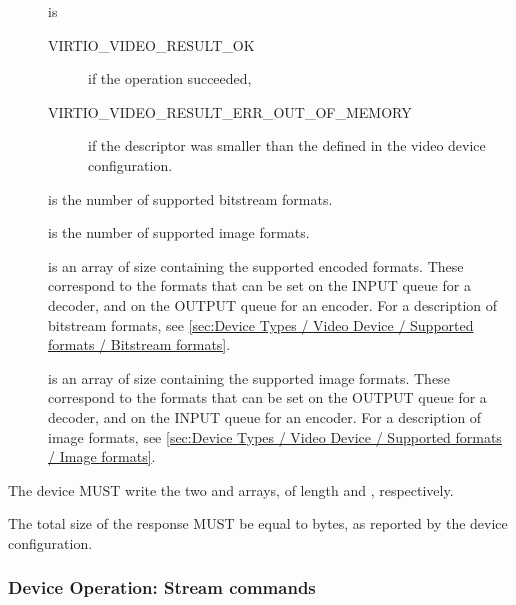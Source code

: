 \begin{description}
\item[]
is

\begin{description}
\item[VIRTIO_VIDEO_RESULT_OK]
if the operation succeeded,
\item[VIRTIO_VIDEO_RESULT_ERR_OUT_OF_MEMORY]
if the descriptor was smaller than the defined  in
the video device configuration.
\end{description}
\item[]
is the number of supported bitstream formats.
\item[]
is the number of supported image formats.
\item[]
is an array of size  containing the
supported encoded formats. These correspond to the formats that can be
set on the INPUT queue for a decoder, and on the OUTPUT queue for an
encoder. For a description of bitstream formats, see
\ref{sec:Device Types / Video Device / Supported formats / Bitstream formats}.
\item[]
is an array of size  containing the supported
image formats. These correspond to the formats that can be set on the
OUTPUT queue for a decoder, and on the INPUT queue for an encoder. For a
description of image formats, see
\ref{sec:Device Types / Video Device / Supported formats / Image formats}.
\end{description}


The device MUST write the two  and
 arrays, of length 
and , respectively.

The total size of the response MUST be equal to 
bytes, as reported by the device configuration.

\subsubsection{Device Operation: Stream commands}\label{sec:Device Types / Video Device / Device Operation / Device Operation: Stream commands}

